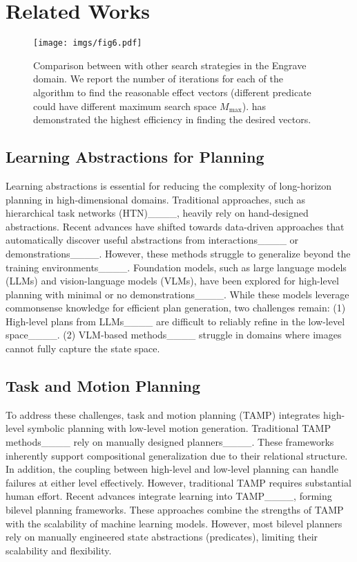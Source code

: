\section{Related Works}
\begin{figure}[!t]
	\centering
	\texttt{[image: imgs/fig6.pdf]}
	\caption{Comparison between \model{} with other search strategies in the Engrave domain. We report the number of iterations for each of the algorithm to find the reasonable effect vectors (different predicate could have different maximum search space $M_{\mathrm{max}}$). \model{} has demonstrated the highest efficiency in finding the desired vectors.}
    \vspace{-0.3cm}
	\label{fig:abla_search}
\end{figure}

\subsection{Learning Abstractions for Planning}
Learning abstractions is essential for reducing the complexity of long-horizon planning in high-dimensional domains.
Traditional approaches, such as hierarchical task networks (HTN)____, heavily rely on hand-designed abstractions.
Recent advances have shifted towards data-driven approaches that automatically discover useful abstractions from interactions____ or demonstrations____.
However, these methods struggle to generalize beyond the training environments____.
Foundation models, such as large language models (LLMs) and vision-language models (VLMs), have been explored for high-level planning with minimal or no demonstrations____. 
While these models leverage commonsense knowledge for efficient plan generation, two challenges remain:
(1) High-level plans from LLMs____ are difficult to reliably refine in the low-level space____.
(2) VLM-based methods____ struggle in domains where images cannot fully capture the state space.

\subsection{Task and Motion Planning}
To address these challenges, task and motion planning (TAMP) integrates high-level symbolic planning with low-level motion generation. 
Traditional TAMP methods____ rely on manually designed planners____. 
These frameworks inherently support compositional generalization due to their relational structure. 
In addition, the coupling between high-level and low-level planning can handle failures at either level effectively.
However, traditional TAMP requires substantial human effort. 
Recent advances integrate learning into TAMP____, forming bilevel planning frameworks. 
These approaches combine the strengths of TAMP with the scalability of machine learning models. 
However, most bilevel planners rely on manually engineered state abstractions (predicates), limiting their scalability and flexibility.

